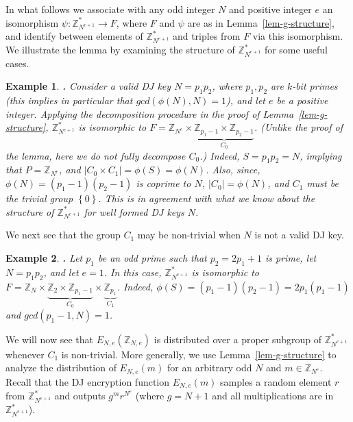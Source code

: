 \documentclass[11pt]{article}
\newcommand{\encdj}{{E}_{N,e}}
\newcommand{\set}[1]{\left\{#1\right\}}
\newcommand{\size}[1]{|#1|}
\newcommand{\Z}{{\mathbb{Z}}}
\newtheorem{EXAMPLE}{Example}[section]
\newenvironment{example}{\begin{EXAMPLE} \hspace{-.85em} {\bf .} \rm}%
	{\end{EXAMPLE}}
\newcommand{\U}[1]{\mathbb{Z}_{#1}^*}
\begin{document}
In what follows we associate with any odd integer $N$ and positive
integer $e$ an isomorphism $\psi:\U{N^{e+1}}\to F$, where $F$ and $\psi$ are as in Lemma~\ref{lem-g-structure}, and identify between
elements of $\U{N^{e+1}}$ and triples from $F$ via this
isomorphism. We illustrate the lemma by examining the structure of
$\U{N^{e+1}}$ for some useful cases.
\begin{example}
\label{ex-valid} Consider a valid DJ key $N=p_1p_2$, where
$p_1,p_2$ are $k$-bit primes (this implies in particular that
$gcd(\phi(N),N)=1$), and let $e$ be a positive integer. Applying
the decomposition procedure in the proof of
Lemma~\ref{lem-g-structure}, $\U{N^{e+1}}$ is isomorphic to
$F=\Z_{N^e}\times \underbrace{\Z_{p_1-1}\times\Z_{p_2-1}}_{C_0}$.
(Unlike the proof of the lemma, here we do not fully decompose
$C_0$.) Indeed, $S=p_1p_2=N$, implying that $P=\Z_{N^e}$, and
$\size{C_0\times C_1}=\phi(S)=\phi(N)$. Also, since,
$\phi(N)=(p_1-1)(p_2-1)$ is coprime to $N$, $\size{C_0}=\phi(N)$,
and $C_1$ must be the trivial group $\set{0}$. This is in agreement
with what we know about the structure of $\U{N^{e+1}}$ for well
formed DJ keys $N$.
\end{example}
We next see that the group $C_1$ may be non-trivial when $N$ is not
a valid DJ key.
\begin{example}
\label{ex-harmful} Let $p_1$ be an odd prime such that $p_2=2p_1+1$
is prime, let $N=p_1p_2$, and let $e=1$. In this case,
$\U{N^{e+1}}$ is isomorphic to
$F=\Z_N\times\underbrace{\Z_2\times\Z_{p_1-1}}_{C_0}\times
\underbrace{\Z_{p_1}}_{C_1}$. Indeed,
$\phi(S)=(p_1-1)(p_2-1)=2p_1(p_1-1)$ and $gcd(p_1-1,N)=1$.
\end{example}

We will now see that $\encdj(\Z_{N,e})$ is distributed over a
proper subgroup of $\U{N^{e+1}}$ whenever $C_1$ is non-trivial.
More generally, we use Lemma~\ref{lem-g-structure} to analyze the
distribution of $\encdj(m)$ for an arbitrary odd $N$ and
$m\in\Z_{N^e}$. Recall that the DJ encryption function $\encdj(m)$
samples a random element $r$ from ${\U{N^{e+1}}}$ and outputs
$g^mr^{N^e}$ (where $g=N+1$ and all multiplications are in
$\U{N^{e+1}}$).
\end{document}
